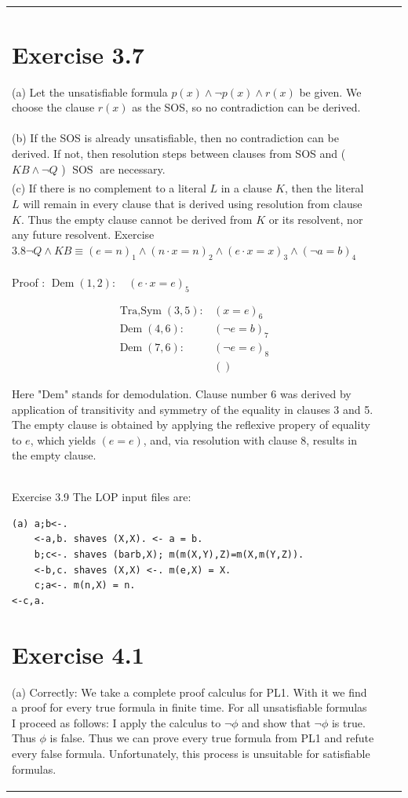 \documentclass[10pt]{book}
\begin{document}
\begin{center}
\begin{tabular}{|l|l|l|}
\section{Exercise 3.7}
(a) Let the unsatisfiable formula $p(x) \wedge \neg p(x) \wedge r(x)$ be given. We choose the clause $r(x)$ as the SOS, so no contradiction can be derived.\\
(b) If the SOS is already unsatisfiable, then no contradiction can be derived. If not, then resolution steps between clauses from SOS and ( $K B \wedge \neg Q$ ) $\operatorname{SOS}$ are necessary.\\
(c) If there is no complement to a literal $L$ in a clause $K$, then the literal $L$ will remain in every clause that is derived using resolution from clause $K$. Thus the empty clause cannot be derived from $K$ or its resolvent, nor any future resolvent.
Exercise $3.8 \neg Q \wedge K B \equiv(e=n)_{1} \wedge(n \cdot x=n)_{2} \wedge(e \cdot x=x)_{3} \wedge(\neg a=b)_{4}$\\
Proof : $\operatorname{Dem}(1,2): \quad(e \cdot x=e)_{5}$

$$
\begin{array}{ll}
\operatorname{Tra,Sym}(3,5): & (x=e)_{6} \\
\operatorname{Dem}(4,6): & (\neg e=b)_{7} \\
\operatorname{Dem}(7,6): & (\neg e=e)_{8} \\
& ()
\end{array}
$$

Here "Dem" stands for demodulation. Clause number 6 was derived by application of transitivity and symmetry of the equality in clauses 3 and 5. The empty clause is obtained by applying the reflexive propery of equality to $e$, which yields $(e=e)$, and, via resolution with clause 8, results in the empty clause.\\
Exercise 3.9 The LOP input files are:

\begin{verbatim}
(a) a;b<-.
    <-a,b. shaves (X,X). <- a = b.
    b;c<-. shaves (barb,X); m(m(X,Y),Z)=m(X,m(Y,Z)).
    <-b,c. shaves (X,X) <-. m(e,X) = X.
    c;a<-. m(n,X) = n.
<-c,a.
\end{verbatim}

\section{Exercise 4.1}
(a) Correctly: We take a complete proof calculus for PL1. With it we find a proof for every true formula in finite time. For all unsatisfiable formulas I proceed as follows: I apply the calculus to $\neg \phi$ and show that $\neg \phi$ is true. Thus $\phi$ is false. Thus we can prove every true formula from PL1 and refute every false formula. Unfortunately, this process is unsuitable for satisfiable formulas.


\end{tabular}
\end{center}
\end{document}
